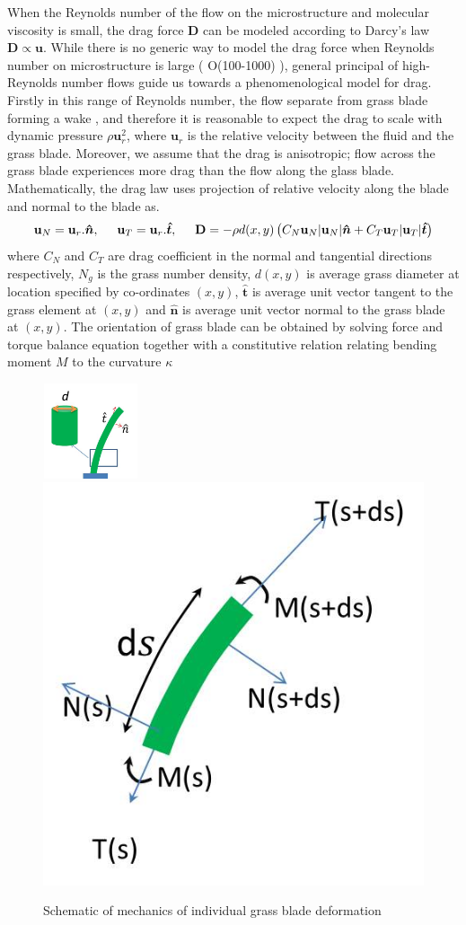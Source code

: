 \documentclass[12pt]{report}   %
\newcommand{\bn}{{\boldsymbol{\hat{n}}}}
\newcommand{\bt}{{\boldsymbol{\hat{t}}}}
\newcommand{\bu}{\mathbf{u}}
\begin{document}
When the Reynolds number of the flow on the microstructure and molecular viscosity is small, the drag force $\mathbf{D}$ can be modeled according to Darcy's law $\mathbf{D} \propto \bu$. While there is no generic way to model the drag force when Reynolds number on microstructure is large ( O(100-1000) ), general principal of high-Reynolds number flows guide us towards a phenomenological model for drag. Firstly in this range of Reynolds number, the flow separate from grass blade forming a wake , and therefore it is reasonable to expect the drag to scale with dynamic pressure $\rho \bu_r^2$, where $\bu_r$ is the relative velocity between the fluid and the grass blade. Moreover, we assume that the drag is anisotropic; flow across the grass blade experiences more drag than the flow along the glass blade. Mathematically, the drag law uses projection of relative velocity along the blade and normal to the blade as.
\begin{equation}
 \bu_N = \bu_r.\bn,\hspace{0.5cm} \bu_T = \bu_r.\bt,\hspace{.5cm} \mathbf{D} = -\rho d(x,y)\left( C_N \bu_N |\bu_N|\bn + C_T \bu_T |\bu_T| \bt \right)
\end{equation} 
where $C_N$ and $C_T$ are drag coefficient in the normal and tangential directions respectively, $N_g$ is the grass number density, $d(x,y)$ is average grass diameter at location specified by co-ordinates $(x,y)$, $\bt$ is average unit vector tangent to the grass element at $(x,y)$ and $\bn$ is average unit vector normal to the grass blade at $(x,y)$. The orientation of grass blade can be obtained by solving force and torque balance equation together with a constitutive relation relating bending moment $M$ to the curvature $\kappa$
\begin{figure}
 \centerline{\includegraphics[width=2.8cm, height = 2.8cm]{Grass_mod1}\hspace{2.5cm} \includegraphics[width=3.cm,height=3.cm]{Grass_mod2}}
 \caption{Schematic of mechanics of individual grass blade deformation}
 \label{grass_blade_deformation}
\end{figure}
\end{document}
